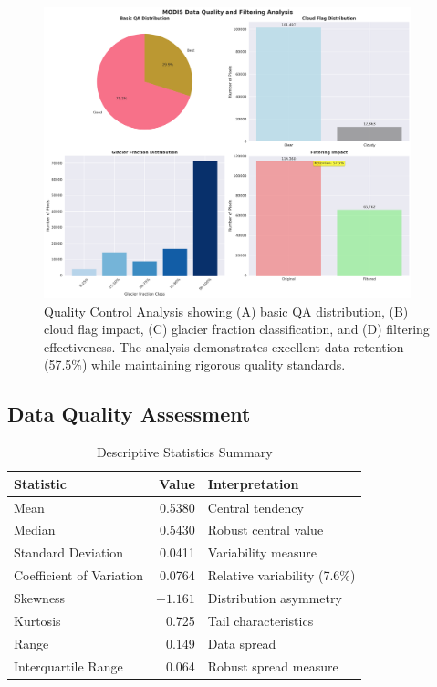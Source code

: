 \documentclass[12pt,a4paper]{article}
\begin{document}
\begin{figure}[H]
\centering
\includegraphics[width=0.95\textwidth]{../../results/plots/qa_quality_analysis.png}
\caption{Quality Control Analysis showing (A) basic QA distribution, (B) cloud flag impact, (C) glacier fraction classification, and (D) filtering effectiveness. The analysis demonstrates excellent data retention (57.5\%) while maintaining rigorous quality standards.}
\label{fig:qa_analysis}
\end{figure}

\subsection{Data Quality Assessment}

\begin{table}[H]
\centering
\caption{Descriptive Statistics Summary}
\label{tab:descriptive_stats}
\begin{tabular}{@{}lrl@{}}
\toprule
\textbf{Statistic} & \textbf{Value} & \textbf{Interpretation} \\
\midrule
Mean & 0.5380 & Central tendency \\
Median & 0.5430 & Robust central value \\
Standard Deviation & 0.0411 & Variability measure \\
Coefficient of Variation & 0.0764 & Relative variability (7.6\%) \\
Skewness & $-1.161$ & Distribution asymmetry \\
Kurtosis & 0.725 & Tail characteristics \\
Range & 0.149 & Data spread \\
Interquartile Range & 0.064 & Robust spread measure \\
\bottomrule
\end{tabular}
\end{table}
\end{document}
